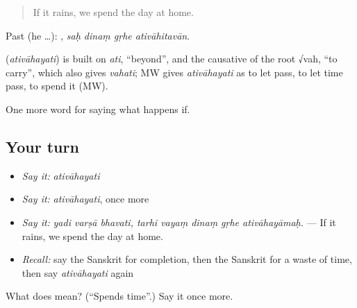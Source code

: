 \begin{quote}
If it rains, we spend the day at home.
\end{quote}

Past (he …):    , \emph{saḥ dinaṃ gṛhe ativāhitavān}.

\begin{cousinweb}
\textbf{} (\emph{ativāhayati}) is built on \emph{ati}, \textquotedblleft{}beyond\textquotedblright{}, and the causative of the root √vah, \textquotedblleft{}to carry\textquotedblright{}, which also gives \emph{vahati}; MW gives \emph{ativāhayati} as to let pass, to let time pass, to spend it (MW).
\end{cousinweb}

\begin{grammarlens}[title={What you've built}]
One more word for saying what happens if.
\end{grammarlens}

\subsection*{Your turn}
\begin{itemize}
\raggedright
  \item \emph{Say it:} \emph{ativāhayati}
  \item \emph{Say it:} \emph{ativāhayati}, once more
  \item \emph{Say it:} \emph{yadi varṣā bhavati, tarhi vayaṃ dinaṃ gṛhe ativāhayāmaḥ.} — If it rains, we spend the day at home.
  \item \emph{Recall:} say the Sanskrit for completion, then the Sanskrit for a waste of time, then say \emph{ativāhayati} again
\end{itemize}

\begin{tcolorbox}[breakable,colback=teal!4,colframe=teal!35!black,title={Before you move on}]
What does  mean? (\textquotedblleft{}Spends time\textquotedblright{}.) Say it once more.
\end{tcolorbox}
